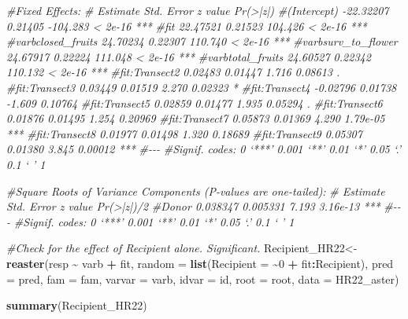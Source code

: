 \documentclass[
]{article}
\newenvironment{Shaded}{\begin{snugshade}}{\end{snugshade}}
\newcommand{\AttributeTok}[1]{\textcolor[rgb]{0.13,0.29,0.53}{#1}}
\newcommand{\CommentTok}[1]{\textcolor[rgb]{0.56,0.35,0.01}{\textit{#1}}}
\newcommand{\DecValTok}[1]{\textcolor[rgb]{0.00,0.00,0.81}{#1}}
\newcommand{\FunctionTok}[1]{\textcolor[rgb]{0.13,0.29,0.53}{\textbf{#1}}}
\newcommand{\NormalTok}[1]{#1}
\newcommand{\OtherTok}[1]{\textcolor[rgb]{0.56,0.35,0.01}{#1}}
\newcommand{\SpecialCharTok}[1]{\textcolor[rgb]{0.81,0.36,0.00}{\textbf{#1}}}
\begin{document}
\begin{Shaded}
\begin{Highlighting}[]
\CommentTok{\#Fixed Effects:}
\CommentTok{\#                    Estimate Std. Error  z value Pr(\textgreater{}|z|)    }
\CommentTok{\#(Intercept)        {-}22.32207    0.21405 {-}104.283  \textless{} 2e{-}16 ***}
\CommentTok{\#fit                 22.47521    0.21523  104.426  \textless{} 2e{-}16 ***}
\CommentTok{\#varbclosed\_fruits   24.70234    0.22307  110.740  \textless{} 2e{-}16 ***}
\CommentTok{\#varbsurv\_to\_flower  24.67917    0.22224  111.048  \textless{} 2e{-}16 ***}
\CommentTok{\#varbtotal\_fruits    24.60527    0.22342  110.132  \textless{} 2e{-}16 ***}
\CommentTok{\#fit:Transect2        0.02483    0.01447    1.716  0.08613 .  }
\CommentTok{\#fit:Transect3        0.03449    0.01519    2.270  0.02323 *  }
\CommentTok{\#fit:Transect4       {-}0.02796    0.01738   {-}1.609  0.10764    }
\CommentTok{\#fit:Transect5        0.02859    0.01477    1.935  0.05294 .  }
\CommentTok{\#fit:Transect6        0.01876    0.01495    1.254  0.20969    }
\CommentTok{\#fit:Transect7        0.05873    0.01369    4.290 1.79e{-}05 ***}
\CommentTok{\#fit:Transect8        0.01977    0.01498    1.320  0.18689    }
\CommentTok{\#fit:Transect9        0.05307    0.01380    3.845  0.00012 ***}
\CommentTok{\#{-}{-}{-}}
\CommentTok{\#Signif. codes:  0 ‘***’ 0.001 ‘**’ 0.01 ‘*’ 0.05 ‘.’ 0.1 ‘ ’ 1}

\CommentTok{\#Square Roots of Variance Components (P{-}values are one{-}tailed):}
\CommentTok{\#      Estimate Std. Error z value Pr(\textgreater{}|z|)/2    }
\CommentTok{\#Donor 0.038347   0.005331   7.193   3.16e{-}13 ***}
\CommentTok{\#{-}{-}{-}}
\CommentTok{\#Signif. codes:  0 ‘***’ 0.001 ‘**’ 0.01 ‘*’ 0.05 ‘.’ 0.1 ‘ ’ 1}

\CommentTok{\#Check for the effect of Recipient alone. Significant. }
\NormalTok{Recipient\_HR22}\OtherTok{\textless{}{-}} \FunctionTok{reaster}\NormalTok{(resp }\SpecialCharTok{\textasciitilde{}}\NormalTok{ varb }\SpecialCharTok{+}\NormalTok{ fit, }\AttributeTok{random =} \FunctionTok{list}\NormalTok{(}\AttributeTok{Recipient =} \SpecialCharTok{\textasciitilde{}}\DecValTok{0} \SpecialCharTok{+} 
\NormalTok{    fit}\SpecialCharTok{:}\NormalTok{Recipient), }\AttributeTok{pred =}\NormalTok{ pred, }\AttributeTok{fam =}\NormalTok{ fam, }\AttributeTok{varvar =}\NormalTok{ varb, }
    \AttributeTok{idvar =}\NormalTok{ id, }\AttributeTok{root =}\NormalTok{ root, }\AttributeTok{data =}\NormalTok{ HR22\_aster)}

\FunctionTok{summary}\NormalTok{(Recipient\_HR22)}
\end{Highlighting}
\end{Shaded}
\end{document}

